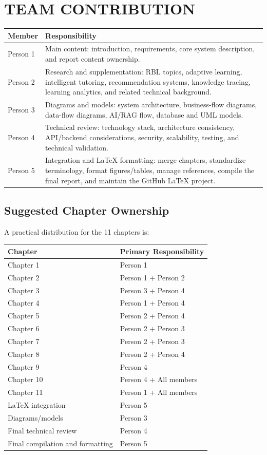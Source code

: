 \chapter*{TEAM CONTRIBUTION}

\begin{longtable}{p{}p{}}
\toprule
\textbf{Member} & \textbf{Responsibility}\\
\midrule
Person 1 & Main content: introduction, requirements, core system description, and report content ownership.\\
Person 2 & Research and supplementation: RBL topics, adaptive learning, intelligent tutoring, recommendation systems, knowledge tracing, learning analytics, and related technical background.\\
Person 3 & Diagrams and models: system architecture, business-flow diagrams, data-flow diagrams, AI/RAG flow, database and UML models.\\
Person 4 & Technical review: technology stack, architecture consistency, API/backend considerations, security, scalability, testing, and technical validation.\\
Person 5 & Integration and LaTeX formatting: merge chapters, standardize terminology, format figures/tables, manage references, compile the final report, and maintain the GitHub LaTeX project.\\
\bottomrule
\end{longtable}

\section*{Suggested Chapter Ownership}

A practical distribution for the 11 chapters is:

\begin{longtable}{p{}p{}}
\toprule
\textbf{Chapter} & \textbf{Primary Responsibility}\\
\midrule
Chapter 1 & Person 1\\
Chapter 2 & Person 1 + Person 2\\
Chapter 3 & Person 3 + Person 4\\
Chapter 4 & Person 1 + Person 4\\
Chapter 5 & Person 2 + Person 4\\
Chapter 6 & Person 2 + Person 3\\
Chapter 7 & Person 2 + Person 3\\
Chapter 8 & Person 2 + Person 4\\
Chapter 9 & Person 4\\
Chapter 10 & Person 4 + All members\\
Chapter 11 & Person 1 + All members\\
LaTeX integration & Person 5\\
Diagrams/models & Person 3\\
Final technical review & Person 4\\
Final compilation and formatting & Person 5\\
\bottomrule
\end{longtable}
